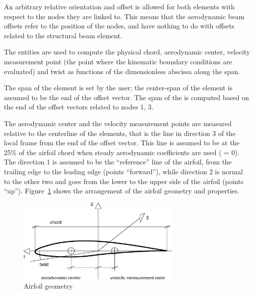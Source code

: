 An arbitrary relative orientation and offset is allowed for both elements with
respect to the nodes they are linked to. 
This means that the aerodynamic beam offsets refer to the position of the nodes,
and have nothing to do with offsets related to the structural beam element.

The  entities are used to compute the physical chord,
aerodynamic center, velocity measurement point (the point where the
kinematic boundary conditions are evaluated) and twist as functions 
of the dimensionless abscissa along the span.

The span of the  element is set by the user; the
center-span of the element is assumed to be the end of the offset vector.
The span of the  is computed based on the end of the
offset vectors related to nodes 1, 3.

The aerodynamic center and the velocity measurement points are measured
relative to the centerline of the elements, that is the line in direction 3
of the local frame from the end of the offset vector.
This line is assumed to be at the 25\% of the airfoil chord when steady
aerodynamic coefficients are used ( = 0).
The direction 1 is assumed to be the ``reference'' line of the airfoil, 
from the trailing edge to the leading edge (points ``forward''),
while direction 2 is normal to the other two and goes from the lower 
to the upper side of the airfoil (points ``up''). 
Figure~\ref{fig:AIRFOIL} shows the arrangement of the airfoil geometry 
and properties.

\begin{figure}[h]
  \centering
    \includegraphics[width=80mm]{airfoil.eps}
  \caption{Airfoil geometry}\label{fig:AIRFOIL}
\end{figure}

